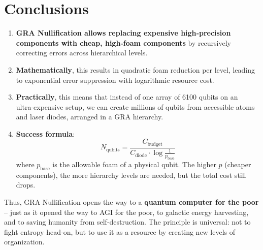 \documentclass[12pt,a4paper]{article}
\begin{document}
\section{Conclusions}

\begin{enumerate}
    \item \textbf{GRA Nullification allows replacing expensive high‑precision components with cheap, high‑foam components} by recursively correcting errors across hierarchical levels.
    \item \textbf{Mathematically}, this results in quadratic foam reduction per level, leading to exponential error suppression with logarithmic resource cost.
    \item \textbf{Practically}, this means that instead of one array of 6100 qubits on an ultra‑expensive setup, we can create millions of qubits from accessible atoms and laser diodes, arranged in a GRA hierarchy.
    \item \textbf{Success formula}:
    \[
    \boxed{N_{\text{qubits}} = \frac{C_{\text{budget}}}{C_{\text{diode}} \cdot \log \frac{1}{p_{\text{base}}}}}
    \]
    where \(p_{\text{base}}\) is the allowable foam of a physical qubit. The higher \(p\) (cheaper components), the more hierarchy levels are needed, but the total cost still drops.
\end{enumerate}

Thus, GRA Nullification opens the way to a \textbf{quantum computer for the poor} – just as it opened the way to AGI for the poor, to galactic energy harvesting, and to saving humanity from self‑destruction. The principle is universal: not to fight entropy head‑on, but to use it as a resource by creating new levels of organization.
\end{document}
